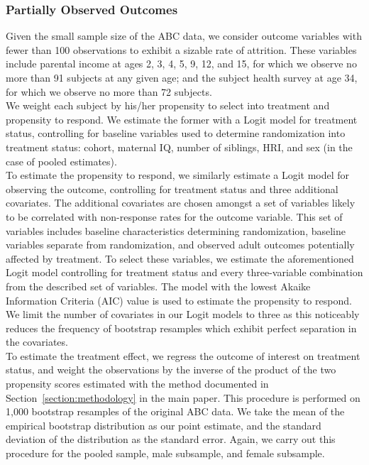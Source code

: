 \subsubsection{Partially Observed Outcomes}
\label{app:method_partialobs}

\noindent Given the small sample size of the ABC data, we consider outcome variables with fewer than 100 observations
to exhibit a sizable rate of attrition. These variables include parental income at ages 2, 3, 4, 5, 9, 12,
and 15, for which we observe no more than 91 subjects at any given age; and the subject health survey at
age 34, for which we observe no more than 72 subjects. \\

\noindent We weight each subject by
his/her propensity to select into treatment and propensity to respond. We estimate the
former with a Logit model for treatment status, controlling for baseline
variables used to determine randomization into treatment status: cohort,
maternal IQ, number of siblings, HRI, and sex (in the case of pooled estimates). \\

\noindent To estimate the propensity to respond, we similarly estimate a Logit model for observing the outcome,
controlling for treatment status and three additional covariates. The additional covariates are
chosen amongst a set of variables likely to be correlated with non-response rates for the outcome variable.
This set of variables includes baseline characteristics determining randomization,
baseline variables separate from randomization, and observed adult outcomes potentially affected by
treatment. To select these variables, we estimate the
aforementioned Logit model controlling for treatment status and every three-variable combination from
the described set of variables. The model with the lowest Akaike Information Criteria (AIC) value is used to estimate the propensity
to respond. We limit the number of covariates in our Logit models to three as this noticeably reduces the frequency of bootstrap resamples which exhibit perfect separation in the covariates. \\

\noindent To estimate the treatment effect, we regress the outcome of interest on treatment status, and weight the
observations by the inverse of the product of the two propensity scores estimated with the method
documented in Section~\ref{section:methodology} in the main paper. This procedure is performed on 1,000 bootstrap resamples of the original ABC data.
We take the mean of the empirical bootstrap distribution as our point estimate, and the standard deviation
of the distribution as the standard error. Again, we carry out this procedure for the
pooled sample, male subsample, and female subsample. \\

